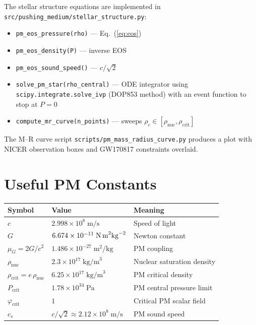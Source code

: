 \documentclass[11pt,a4paper]{article}
\newcommand{\rhonuc}{\rho_\text{nuc}}
\newcommand{\rhocrit}{\rho_\text{crit}}
\newcommand{\pcrit}{P_\text{crit}}
\newcommand{\muG}{\mu_G}
\begin{document}
The stellar structure equations are implemented in
\texttt{src/pushing\_medium/stellar\_structure.py}:

\begin{itemize}
  \item \texttt{pm\_eos\_pressure(rho)} — Eq.~(\ref{eq:eos})
  \item \texttt{pm\_eos\_density(P)} — inverse EOS
  \item \texttt{pm\_eos\_sound\_speed()} — $c/\sqrt{2}$
  \item \texttt{solve\_pm\_star(rho\_central)} — ODE integrator using
    \texttt{scipy.integrate.solve\_ivp} (DOP853 method) with an event
    function to stop at $P = 0$
  \item \texttt{compute\_mr\_curve(n\_points)} — sweeps $\rho_c \in [\rhonuc,\rhocrit]$
\end{itemize}

The M--R curve script \texttt{scripts/pm\_mass\_radius\_curve.py} produces
a plot with NICER observation boxes and GW170817 constraints overlaid.

\appendix
\section{Useful PM Constants}

\begin{center}
\begin{tabular}{lll}
  \toprule
  Symbol & Value & Meaning \\
  \midrule
  $c$ & $2.998 \times 10^8\;\text{m/s}$ & Speed of light \\
  $G$ & $6.674 \times 10^{-11}\;\text{N\,m}^2\text{kg}^{-2}$ & Newton constant \\
  $\muG = 2G/c^2$ & $1.486 \times 10^{-27}\;\text{m}^2/\text{kg}$ & PM coupling \\
  $\rhonuc$ & $2.3 \times 10^{17}\;\text{kg/m}^3$ & Nuclear saturation density \\
  $\rhocrit = e\,\rhonuc$ & $6.25 \times 10^{17}\;\text{kg/m}^3$ & PM critical density \\
  $\pcrit$ & $1.78 \times 10^{34}\;\text{Pa}$ & PM central pressure limit \\
  $\varphi_\text{crit}$ & $1$ & Critical PM scalar field \\
  $c_s$ & $c/\sqrt{2} \approx 2.12 \times 10^8\;\text{m/s}$ & PM sound speed \\
  \bottomrule
\end{tabular}
\end{center}
\end{document}
